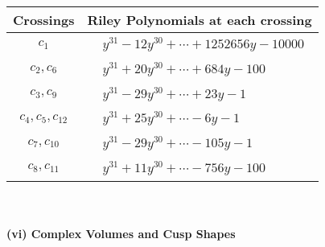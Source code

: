 \documentclass[1p]{elsarticle_modified}
\theoremstyle{definition}
\begin{document}
\begin{tabular}{m{50pt}|m{274pt}}
Crossings & \hspace{64pt}Riley Polynomials at each crossing \\
\hline $$\begin{aligned}c_{1}\end{aligned}$$&$\begin{aligned}
&y^{31}-12 y^{30}+\cdots+1252656 y-10000
\end{aligned}$\\
\hline $$\begin{aligned}c_{2},c_{6}\end{aligned}$$&$\begin{aligned}
&y^{31}+20 y^{30}+\cdots+684 y-100
\end{aligned}$\\
\hline $$\begin{aligned}c_{3},c_{9}\end{aligned}$$&$\begin{aligned}
&y^{31}-29 y^{30}+\cdots+23 y-1
\end{aligned}$\\
\hline $$\begin{aligned}c_{4},c_{5},c_{12}\end{aligned}$$&$\begin{aligned}
&y^{31}+25 y^{30}+\cdots-6 y-1
\end{aligned}$\\
\hline $$\begin{aligned}c_{7},c_{10}\end{aligned}$$&$\begin{aligned}
&y^{31}-29 y^{30}+\cdots-105 y-1
\end{aligned}$\\
\hline $$\begin{aligned}c_{8},c_{11}\end{aligned}$$&$\begin{aligned}
&y^{31}+11 y^{30}+\cdots-756 y-100
\end{aligned}$\\
\hline
\end{tabular}\\~\\
\newpage\flushleft \textbf{(vi) Complex Volumes and Cusp Shapes}
\end{document}
